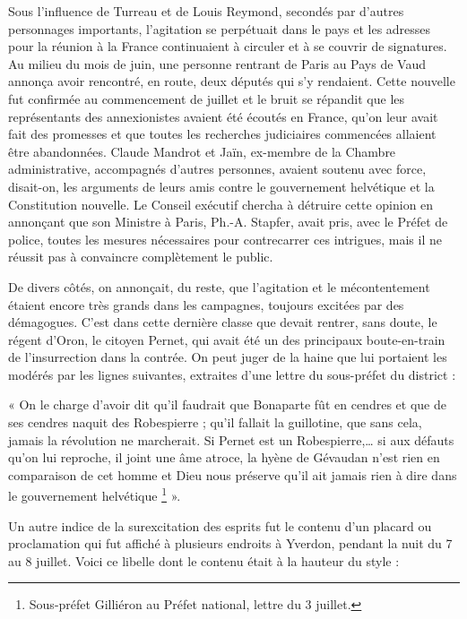 \documentclass[french,twoside]{book} %
\newenvironment{quoteblock}%
  {\begin{quoting}}
  {\end{quoting}}
\newenvironment{quotebar}{%
    \def\FrameCommand{{\color{rubric!10!}\vrule width 0.5em} \hspace{0.9em}}%
    \def\OuterFrameSep{\itemsep} %
    \MakeFramed {\advance\hsize-\width \FrameRestore}
  }%
  {%
    \endMakeFramed
  }
\renewenvironment{quoteblock}%
  {%
    \savenotes
    \setstretch{0.9}
    \begin{quotebar}
  }
  {%
    \end{quotebar}
    \spewnotes
  }
\begin{document}
\noindent Sous l’influence de Turreau et de Louis Reymond, secondés par d’autres personnages importants, l’agitation se perpétuait dans le pays et les adresses pour la réunion à la France continuaient à circuler et à se couvrir de signatures. Au milieu du mois de juin, une personne rentrant de Paris au Pays de Vaud annonça avoir rencontré, en route, deux députés qui s’y rendaient. Cette nouvelle fut confirmée au commencement de juillet et le bruit se répandit que les représentants des annexionistes avaient été écoutés en France, qu’on leur avait fait des promesses et que toutes les recherches judiciaires commencées allaient être abandonnées. Claude Mandrot et Jaïn, ex-membre de la Chambre administrative, accompagnés d’autres personnes, avaient soutenu avec force, disait-on, les arguments de leurs amis contre le gouvernement helvétique et la Constitution nouvelle. Le Conseil exécutif chercha à détruire cette opinion en annonçant que son Ministre à Paris, Ph.-A. Stapfer, avait pris, avec le Préfet de police, toutes les mesures nécessaires pour contrecarrer ces intrigues, mais il ne réussit pas à convaincre complètement le public.\par
De divers côtés, on annonçait, du reste, que l’agitation et le mécontentement étaient encore très grands dans les campagnes, toujours excitées par des démagogues. C’est dans cette dernière classe que devait rentrer, sans doute, le régent d’Oron, le citoyen Pernet, qui avait été un des principaux boute-en-train de l’insurrection dans la contrée. On peut juger de la haine que lui portaient les modérés par les lignes suivantes, extraites d’une lettre du sous-préfet du district :\par

\begin{quoteblock}
 \noindent  « On le charge d’avoir dit qu’il faudrait que Bonaparte fût en cendres et que de ses cendres naquit des Robespierre ; qu’il fallait la guillotine, que sans cela, jamais la révolution ne marcherait. Si Pernet est un Robespierre,… si aux défauts qu’on lui reproche, il joint une âme atroce, la hyène de Gévaudan n’est rien en comparaison de cet homme et Dieu nous préserve qu’il ait jamais rien à dire dans le gouvernement helvétique \footnote{Sous-préfet Gilliéron au Préfet national, lettre du 3 juillet.} ».
 \end{quoteblock}

\noindent Un autre indice de la surexcitation des esprits fut le contenu d’un placard ou proclamation qui fut affiché à plusieurs endroits à Yverdon, pendant la nuit du 7 au 8 juillet. Voici ce libelle dont le contenu était à la hauteur du style :\par
\end{document}
